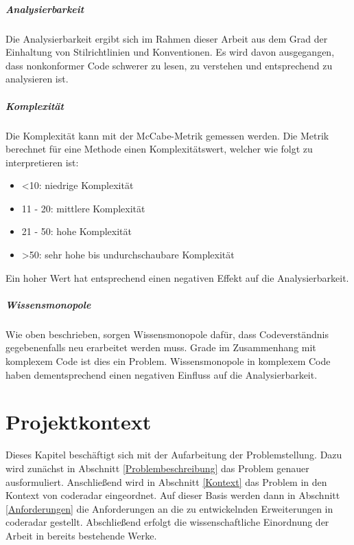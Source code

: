 \documentclass[
	oneside,  %
	ngerman, 
	final, 
	11pt, 
	a4paper, 
	1.1headlines, 
	headinclude=false, 
	footinclude=false, 
	mpinclude=false, 
	pagesize, 
	onecolumn, 
	titlepage, 
	parskip=half, 
	headsepline, 
	chapterprefix=false, 
	version=first, 
	listof=totoc, 
	bibliography=totoc, 
	toc=graduated, 
	fleqn
]{scrbook}
\begin{document}
\paragraph{Analysierbarkeit}
Die Analysierbarkeit ergibt sich im Rahmen dieser Arbeit aus dem Grad der Einhaltung von Stilrichtlinien und Konventionen.
Es wird davon ausgegangen, dass nonkonformer Code schwerer zu lesen, zu verstehen und entsprechend zu analysieren ist.

\paragraph{Komplexität}
Die Komplexität kann mit der McCabe-Metrik gemessen werden.
Die Metrik berechnet für eine Methode einen Komplexitätswert, welcher wie folgt zu interpretieren ist:

\begin{itemize}
	\item <10: niedrige Komplexität
	\item 11 - 20: mittlere Komplexität
	\item 21 - 50: hohe Komplexität
	\item >50: sehr hohe bis undurchschaubare Komplexität
\end{itemize}

Ein hoher Wert hat entsprechend einen negativen Effekt auf die Analysierbarkeit.

\paragraph{Wissensmonopole}
Wie oben beschrieben, sorgen Wissensmonopole dafür, dass Codeverständnis gegebenenfalls neu erarbeitet werden muss.
Grade im Zusammenhang mit komplexem Code ist dies ein Problem.
Wissensmonopole in komplexem Code haben dementsprechend einen negativen Einfluss auf die Analysierbarkeit.



\chapter{Projektkontext}
\label{Projektkontext}
Dieses Kapitel beschäftigt sich mit der Aufarbeitung der Problemstellung.
Dazu wird zunächst in Abschnitt \ref{Problembeschreibung} das Problem genauer ausformuliert.
Anschließend wird in Abschnitt \ref{Kontext} das Problem in den Kontext von coderadar eingeordnet.
Auf dieser Basis werden dann in Abschnitt \ref{Anforderungen} die Anforderungen an die zu entwickelnden Erweiterungen in coderadar gestellt.
Abschließend erfolgt die wissenschaftliche Einordnung der Arbeit in bereits bestehende Werke.
\end{document}
